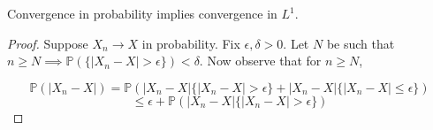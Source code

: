     \begin{theorem}
        Convergence in probability implies convergence in $L^1$.
    \end{theorem}
    \begin{proof}
        Suppose $X_n \to X$ in probability. Fix $\epsilon, \delta > 0$. Let 
        $N$ be such that $n \geq N \implies \mathbb P(\{|X_n - X| > \epsilon\}) < \delta$. 
        Now observe that for $n \geq N$,

        \[ \mathbb P(|X_n - X|) = \mathbb P(|X_n - X|\{|X_n - X| > \epsilon \} + |X_n - X|\{|X_n - X| \leq \epsilon \})\]
        \[ \leq \epsilon + \mathbb P(|X_n - X|\{|X_n - X| > \epsilon \}) \]

    \end{proof}